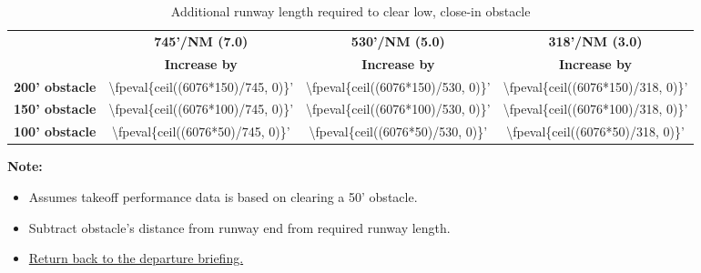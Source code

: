 \begin{table}[H]
    \hypertarget{runway-length-table}{\caption{Additional runway length required to clear low, close-in obstacle}}

    \begin{center}
        \begin{tabular}{lccc}
            \toprule
                                   & \multicolumn{1}{c}{\textbf{745'/NM (7.0\textdegree{})}} & \multicolumn{1}{c}{\textbf{530'/NM (5.0\textdegree{})}} & \multicolumn{1}{c}{\textbf{318'/NM (3.0\textdegree{})}}
            \\\cmidrule(lr){2-2}\cmidrule(lr){3-3}\cmidrule(lr){4-4}
                                   & \textbf{Increase by}                                    & \textbf{Increase by}                                    & \textbf{Increase by}                                    \\\midrule
            \textbf{200' obstacle} & \num{\fpeval{ceil((6076*150)/745, 0)}}'                 & \num{\fpeval{ceil((6076*150)/530, 0)}}'                 & \num{\fpeval{ceil((6076*150)/318, 0)}}'                 \\
            \textbf{150' obstacle} & \num{\fpeval{ceil((6076*100)/745, 0)}}'                 & \num{\fpeval{ceil((6076*100)/530, 0)}}'                 & \num{\fpeval{ceil((6076*100)/318, 0)}}'                 \\
            \textbf{100' obstacle} & \num{\fpeval{ceil((6076*50)/745, 0)}}'                  & \num{\fpeval{ceil((6076*50)/530, 0)}}'                  & \num{\fpeval{ceil((6076*50)/318, 0)}}'                  \\
            \bottomrule
        \end{tabular}
    \end{center}

    \textbf{Note:}
    \begin{itemize}
        \item Assumes takeoff performance data is based on clearing a 50' obstacle.
        \item Subtract obstacle's distance from runway end from required runway length.
        \item \hyperlink{departure-briefing}{Return back to the departure briefing.}
    \end{itemize}
\end{table}

